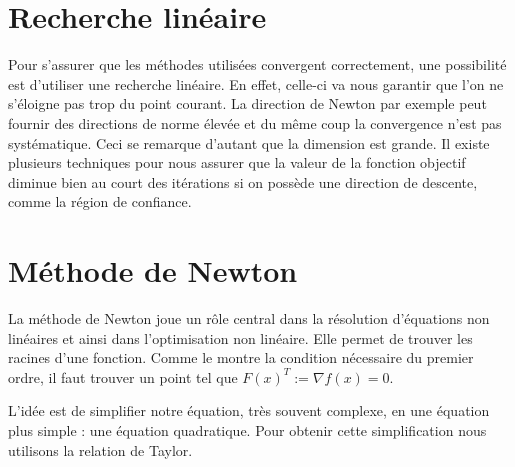 \section{Recherche lin\'eaire}
Pour s'assurer que les m\'ethodes utilis\'ees convergent correctement, une possibilit\'e est d'utiliser une recherche lin\'eaire. En effet, celle-ci
va nous garantir que l'on ne s'\'eloigne pas trop du point courant. La direction de Newton par exemple peut fournir des directions
de norme \'elev\'ee et du même coup la convergence n'est pas syst\'ematique. Ceci se remarque d'autant que la dimension est grande.
Il existe plusieurs techniques pour nous assurer que la valeur de la fonction objectif diminue bien au court des it\'erations
si on poss\`ede une direction de descente, comme la r\'egion de confiance.




\section{M\'ethode de Newton}


La m\'ethode de Newton joue un rôle central dans la r\'esolution d'\'equations non lin\'eaires et ainsi dans l'optimisation
non lin\'eaire. Elle permet de trouver les racines d'une fonction. Comme le montre la condition n\'ecessaire du premier ordre,
il faut trouver un point tel que $F(x)^T:=\nabla f(x)=0$.

 L'id\'ee est de simplifier notre \'equation, tr\`es souvent complexe, en une \'equation plus simple : une \'equation
quadratique. Pour obtenir cette simplification nous utilisons la relation de Taylor.


%


